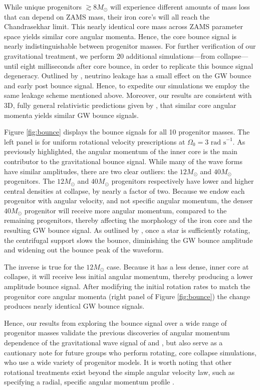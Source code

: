 \documentclass[twocolumn,times]{aastex62}  %
\begin{document}
While unique progenitors $\gtrsim 8 M_\odot$ will experience different amounts of mass loss that can depend on ZAMS mass,  their iron core's will all reach the Chandrasekhar limit.  This nearly identical core mass across ZAMS parameter space yields similar core angular momenta.  Hence, the core bounce signal is nearly indistinguishable between progenitor masses.  For further verification of our gravitational treatment, we perform 20 additional simulations---from collapse---until eight milliseconds after core bounce, in order to replicate this bounce signal degeneracy.  Outlined by \citet{ott:2012}, neutrino leakage has a small effect on the GW bounce and early post bounce signal.  Hence, to expedite our simulations we employ the same leakage scheme mentioned above.  Moreover, our results are consistent with 3D, fully general relativistic predictions given by \citet{ott:2012}, that similar core angular momenta yields similar GW bounce signals.  

Figure \ref{fig:bounce} displays the bounce signals for all 10 progenitor masses.  The left panel is for uniform rotational velocity prescriptions at $\Omega_0 = 3\text{ rad s}^{-1}$.  As previously highlighted, the angular momentum of the inner core is the main contributor to the gravitational bounce signal.  While many of the wave forms have similar amplitudes, there are two clear outliers: the $12 M_\odot$ and $40 M_\odot$ progenitors.  The $12 M_\odot$ and $40 M_\odot$ progenitors respectively have lower and higher central densities at collapse, by nearly a factor of two.  Because we endow each progenitor with angular velocity, and not specific angular momentum, the denser $40 M_\odot$ progenitor will receive more angular momentum, compared to the remaining progenitors, thereby affecting the morphology of the iron core and the resulting GW bounce signal.  As outlined by \citet{dimm:2008}, once a star is sufficiently rotating, the centrifugal support slows the bounce, diminishing the GW bounce amplitude and widening out the bounce peak of the waveform.  

The inverse is true for the $12 M_\odot$ case.  Because it has a less dense, inner core at collapse, it will receive less initial angular momentum, thereby producing a lower amplitude bounce signal.  After modifying the initial rotation rates to match the progenitor core angular momenta (right panel of Figure \ref{fig:bounce}) the change produces nearly identical GW bounce signals.  

Hence, our results from exploring the bounce signal over a wide range of progenitor masses validate the previous discoveries of angular momentum dependence of the gravitational wave signal of \citet{dimm:2008} and \citet{abdik:2010,abdik:2014}, but also serve as a cautionary note for future groups who perform rotating, core collapse simulations, who use a wide variety of progenitor models.  It is worth noting that other rotational treatments exist beyond the simple angular velocity law, such as specifying a radial, specific angular momentum profile \citep[eg.][]{oconnor:2011}.  
\end{document}
